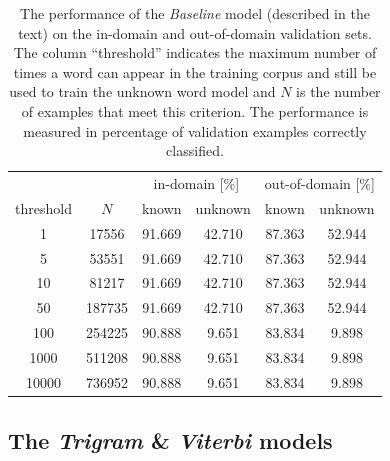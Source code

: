 \documentclass[11pt]{article}
\begin{document}
\begin{table}[htbp]
\begin{center}
\begin{tabular}{c c cccc}
\toprule
&& \multicolumn{2}{c}{in-domain [\%]} & \multicolumn{2}{c}{out-of-domain [\%]}\\
threshold & $N$ & known & unknown & known & unknown \\\midrule
1 & 17556 & 91.669 & 42.710 & 87.363 & 52.944\\
5 & 53551 & 91.669 & 42.710 & 87.363 & 52.944\\
10 & 81217 & 91.669 & 42.710 & 87.363 & 52.944\\
50 & 187735 & 91.669 & 42.710 & 87.363 & 52.944\\
100 & 254225 & 90.888 & 9.651 & 83.834 & 9.898\\
1000 & 511208 & 90.888 & 9.651 & 83.834 & 9.898\\
10000 & 736952 & 90.888 & 9.651 & 83.834 & 9.898\\\bottomrule
\end{tabular}
\end{center}
\caption{%
The performance of the \emph{Baseline} model (described in the text) on the
in-domain and out-of-domain validation sets.
The column ``threshold'' indicates the maximum number of times a word can
appear in the training corpus and still be used to train the unknown word
model and $N$ is the number of examples that meet this criterion.
The performance is measured in percentage of validation examples correctly
classified.
\label{tab:baseline}}
\end{table}

\subsection{The \emph{Trigram} \& \emph{Viterbi} models}
\end{document}
